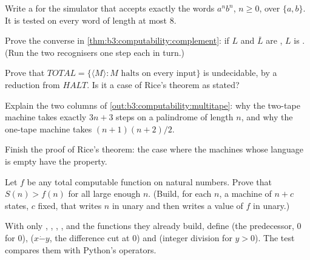 \begin{exercise}[$\star\star$]\label{exo:b3:computability:6}
Write a  for the simulator that accepts exactly the words $a^n b^n$, $n \ge 0$, over $\{a, b\}$. It is tested on every word of length at most 8.
\end{exercise}

\begin{exercise}[$\star\star$]\label{exo:b3:computability:7}
Prove the converse in \cref{thm:b3:computability:complement}: if $L$ and $\overline{L}$ are , $L$ is . (Run the two recognisers one step each in turn.)
\end{exercise}

\begin{exercise}[$\star\star$]\label{exo:b3:computability:8}
Prove that $\mathit{TOTAL} = \{ \langle M \rangle : M \text{ halts on every input} \}$ is undecidable, by a reduction from $\mathit{HALT}$. Is it a case of Rice's theorem as stated?
\end{exercise}

\begin{exercise}[$\star\star$]\label{exo:b3:computability:9}
Explain the two columns of \cref{out:b3:computability:multitape}: why the two-tape machine takes exactly $3n + 3$ steps on a palindrome of length $n$, and why the one-tape machine takes $(n + 1)(n + 2)/2$.
\end{exercise}

\begin{exercise}[$\star\star\star$]\label{exo:b3:computability:10}
Finish the proof of Rice's theorem: the case where the machines whose language is empty have the property.
\end{exercise}

\begin{exercise}[$\star\star\star$]\label{exo:b3:computability:11}
Let $f$ be any total computable function on natural numbers. Prove that $S(n) > f(n)$ for all large enough $n$. (Build, for each $n$, a machine of $n + c$ states, $c$ fixed, that writes $n$ in unary and then writes a value of $f$ in unary.)
\end{exercise}

\begin{exercise}[$\star\star\star$]\label{exo:b3:computability:12}
With only , , , ,  and the functions they already build, define  (the predecessor, 0 for 0),  ($x \mathbin{\dot-} y$, the difference cut at 0) and  (integer division for $y > 0$). The test compares them with Python's operators.
\end{exercise}

